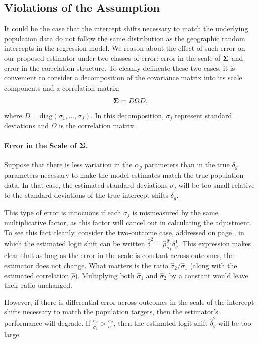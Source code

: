 \subsection{Violations of the Assumption}

It could be the case that the intercept shifts necessary to match the underlying population data do not follow the same distribution as the geographic random intercepts in the regression model. We reason about the effect of such error on our proposed estimator under two classes of error: error in the scale of $\mathbf{\Sigma}$ and error in the correlation structure. To cleanly delineate these two cases, it is convenient to consider a decomposition of the covariance matrix into its scale components and a correlation matrix: 
\begin{align*}
	\mathbf{\Sigma} = D \Omega D,
\end{align*}
where $D = \text{diag}(\sigma_1, \dots, \sigma_J)$.
In this decomposition, $\sigma_j$ represent standard deviations and $\Omega$ is the correlation matrix.

\paragraph{Error in the Scale of $\mathbf{\Sigma}$.} Suppose that there is less variation in the $\alpha_g$ parameters than in the true $\delta_g$ parameters necessary to make the model estimates match the true population data. In that case, the estimated standard deviations $\sigma_j$ will be too small relative to the standard deviations of the true intercept shifts $\delta_g$. 

This type of error is innocuous if each $\sigma_j$ is mismeasured by the same multiplicative factor, as this factor will cancel out in calculating the adjustment. To see this fact cleanly, consider the two-outcome case, addressed on page \pageref{page:twooutcomes}, in which the estimated logit shift can be written $\hat{\delta}^2  = \hat{\rho} \frac{\hat{\sigma}_{2}}{\hat{\sigma}_1} \delta_g^1$. This expression makes clear that as long as the error in the scale is constant across outcomes, the estimator does not change. What matters is the ratio $\hat{\sigma}_2 / \hat{\sigma}_1$ (along with the estimated correlation $\hat{\rho}$). Multiplying both $\hat{\sigma}_1$ and $\hat{\sigma}_2$ by a constant would leave their ratio unchanged. 

However, if there is differential error across outcomes in the scale of the intercept shifts necessary to match the population targets, then the estimator's performance will degrade. If $\frac{\hat{\sigma_2}}{\hat{\sigma_1}} > \frac{\sigma_2}{\sigma_1}$, then the estimated logit shift $\hat{\delta}^2_g$ will be too large. 

